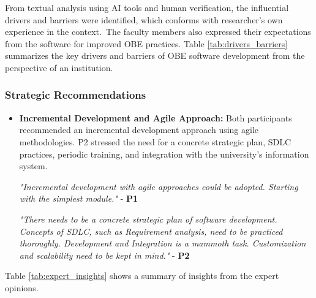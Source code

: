 \documentclass[journal,onecolumn]{IEEEtran}
\begin{document}
From textual analysis using AI tools and human verification, the influential drivers and barriers were identified, which conforms with researcher’s own experience in the context. The faculty members also expressed their expectations from the software for improved OBE practices. Table \ref{tab:drivers_barriers} summarizes the key drivers and barriers of OBE software development from the perspective of an institution. 



\subsubsection{\textbf{Strategic Recommendations}}
\begin{itemize}
    \item \textbf{Incremental Development and Agile Approach:} Both participants recommended an incremental development approach using agile methodologies. P2 stressed the need for a concrete strategic plan, SDLC practices, periodic training, and integration with the university’s information system.


\textit{"Incremental development with agile approaches could be adopted. Starting with the simplest module."} - \textbf{P1}

\textit{"There needs to be a concrete strategic plan of software development. Concepts of SDLC, such as Requirement analysis, need to be practiced thoroughly. Development and Integration is a mammoth task. Customization and scalability need to be kept in mind."} - \textbf{P2}
\end{itemize}


Table \ref{tab:expert_insights} shows a summary of insights from the expert opinions. 
\end{document}
